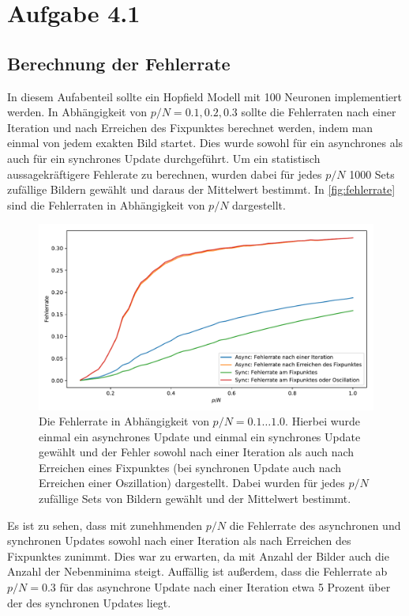 \section{Aufgabe 4.1}
\subsection{Berechnung der Fehlerrate}
In diesem Aufabenteil sollte ein Hopfield Modell mit 100 Neuronen implementiert werden. In Abhängigkeit von $p/N = 0.1, 0.2, 0.3$ sollte die Fehlerraten nach einer Iteration und nach Erreichen des Fixpunktes berechnet werden, indem man einmal von jedem exakten Bild startet. Dies wurde sowohl für ein asynchrones als auch für ein synchrones Update durchgeführt. Um ein statistisch aussagekräftigere Fehlerate zu berechnen, wurden dabei für jedes $p/N$ 1000 Sets zufällige Bildern gewählt und daraus der Mittelwert bestimmt. In \autoref{fig:fehlerrate} sind die Fehlerraten in Abhängigkeit von $p/N$ dargestellt.

\begin{figure}[htp]
	\centering
	\includegraphics[width = \textwidth]{images/4_1/fehlerrate_1000.pdf}
	\caption{Die Fehlerrate in Abhängigkeit von $p / N = 0.1 \dots 1.0$. Hierbei wurde einmal ein asynchrones Update und einmal ein synchrones Update gewählt und der Fehler sowohl nach einer Iteration als auch nach Erreichen eines Fixpunktes (bei synchronen Update auch nach Erreichen einer Oszillation) dargestellt. Dabei wurden für jedes $p/N$ zufällige Sets von Bildern gewählt und der Mittelwert bestimmt.}
	\label{fig:fehlerrate}
\end{figure}

\noindent Es ist zu sehen, dass mit zunehhmenden $p/N$ die Fehlerrate des asynchronen und synchronen Updates sowohl nach einer Iteration als nach Erreichen des Fixpunktes zunimmt. Dies war zu erwarten, da mit Anzahl der Bilder auch die Anzahl der Nebenminima steigt. Auffällig ist außerdem, dass die Fehlerrate ab $p/N = 0.3$ für das asynchrone Update nach einer Iteration etwa 5 Prozent über der des synchronen Updates liegt. 

